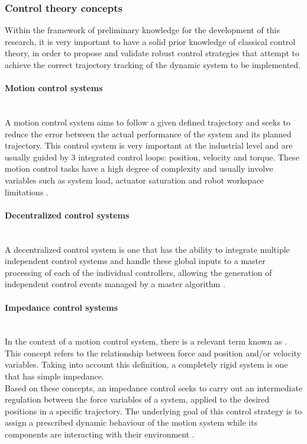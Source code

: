 \documentclass[11pt]{report} %
\newcommand{\subsubsubsection}[1]{\paragraph{#1}\mbox{}\\}
\begin{document}
\subsubsection{Control theory concepts}

Within the framework of preliminary knowledge for the development of this research, it is very important to have a solid prior knowledge of classical control theory, in order to propose and validate robust control strategies that attempt to achieve the correct trajectory tracking of the dynamic system to be implemented.\\

\subsubsubsection{Motion control systems}

A motion control system aims to follow a given defined trajectory and seeks to reduce the error between the actual performance of the system and its planned trajectory. This control system is very important at the industrial level and are usually guided by 3 integrated control loops: position, velocity and torque. These motion control tasks have a high degree of complexity and usually involve variables such as system load, actuator saturation and robot workspace limitations \citep{cite_position_control_for_linear_motion_servo_systems}.\\

\subsubsubsection{Decentralized control systems}

A decentralized control system is one that has the ability to integrate multiple independent control systems and handle these global inputs to a master processing of each of the individual controllers, allowing the generation of independent control events managed by a master algorithm \citep{cite_centralized_control_systems_book}.\\

\subsubsubsection{Impedance control systems}

In the context of a motion control system, there is a relevant term known as . This concept refers to the relationship between force and position and/or velocity variables. Taking into account this definition, a completely rigid system is one that has simple impedance.\\

Based on these concepts, an impedance control seeks to carry out an intermediate regulation between the force variables of a system, applied to the desired positions in a specific trajectory. The underlying goal of this control strategy is to assign a prescribed dynamic behaviour of the motion system while its components are interacting with their environment \citep{cite_canudas_theory_of_robotic_control}.\\
\end{document}
